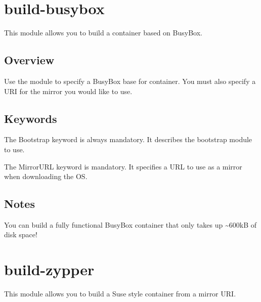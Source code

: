 \documentclass[letterpaper,10pt,english]{sphinxmanual}
\begin{document}
\section{build-busybox}
\label{\detokenize{appendix:build-busybox}}\label{\detokenize{appendix:sec-build-busybox}}
This module allows you to build a container based on BusyBox.


\subsection{Overview}
\label{\detokenize{appendix:id17}}
Use the  module to specify a BusyBox base for container. You must also specify a URI for the mirror you would like to use.


\subsection{Keywords}
\label{\detokenize{appendix:id18}}
%
\begin{sphinxVerbatim}[commandchars=\\\{\}]
 
\end{sphinxVerbatim}

The Bootstrap keyword is always mandatory. It describes the bootstrap module to use.

%
\begin{sphinxVerbatim}[commandchars=\\\{\}]
 
\end{sphinxVerbatim}

The MirrorURL keyword is mandatory. It specifies a URL to use as a mirror when downloading the OS.


\subsection{Notes}
\label{\detokenize{appendix:id19}}
You can build a fully functional BusyBox container that only takes up \textasciitilde{}600kB of disk space!


\section{build-zypper}
\label{\detokenize{appendix:build-zypper}}\label{\detokenize{appendix:sec-build-zypper}}
This module allows you to build a Suse style container from a mirror URI.
\end{document}
